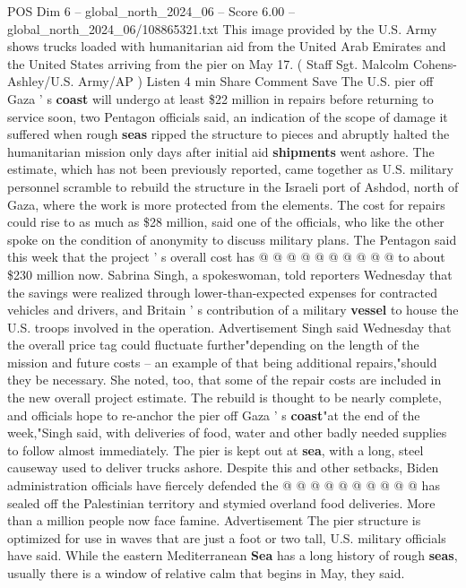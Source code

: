 \begin{textsample}{POS Dim 6 – global\_north\_2024\_06 – Score 6.00 – global\_north\_2024\_06/108865321.txt}  \label{ex:f6_pos_145}
This image provided by the U.S.
Army shows trucks loaded with humanitarian aid from the United Arab Emirates and the United States arriving from the pier on May 17. ( Staff Sgt.
Malcolm Cohens-Ashley/U.S.
Army/AP ) Listen 4 min Share Comment Save The U.S. pier off Gaza ' s \textbf{coast} will undergo at least \$22 million in repairs before returning to service soon, two Pentagon officials said, an indication of the scope of damage it suffered when rough \textbf{seas} ripped the structure to pieces and abruptly halted the humanitarian mission only days after initial aid \textbf{shipments} went ashore.
The estimate, which has not been previously reported, came together as U.S. military personnel scramble to rebuild the structure in the Israeli port of Ashdod, north of Gaza, where the work is more protected from the elements.
The cost for repairs could rise to as much as \$28 million, said one of the officials, who like the other spoke on the condition of anonymity to discuss military plans.
The Pentagon said this week that the project ' s overall cost has @ @ @ @ @ @ @ @ @ @ to about \$230 million now.
Sabrina Singh, a spokeswoman, told reporters Wednesday that the savings were realized through lower-than-expected expenses for contracted vehicles and drivers, and Britain ' s contribution of a military \textbf{vessel} to house the U.S. troops involved in the operation.
Advertisement Singh said Wednesday that the overall price tag could fluctuate further"depending on the length of the mission and future costs -- an example of that being additional repairs,"should they be necessary.
She noted, too, that some of the repair costs are included in the new overall project estimate.
The rebuild is thought to be nearly complete, and officials hope to re-anchor the pier off Gaza ' s \textbf{coast}"at the end of the week,"Singh said, with deliveries of food, water and other badly needed supplies to follow almost immediately.
The pier is kept out at \textbf{sea}, with a long, steel causeway used to deliver trucks ashore.
Despite this and other setbacks, Biden administration officials have fiercely defended the @ @ @ @ @ @ @ @ @ @ has sealed off the Palestinian territory and stymied overland food deliveries.
More than a million people now face famine.
Advertisement The pier structure is optimized for use in waves that are just a foot or two tall, U.S. military officials have said.
While the eastern Mediterranean \textbf{Sea} has a long history of rough \textbf{seas}, usually there is a window of relative calm that begins in May, they said.

\end{textsample}
